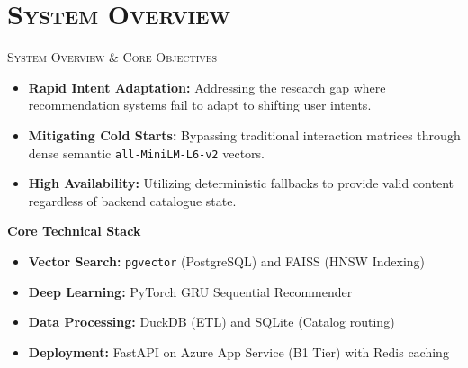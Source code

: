 \documentclass[xcolor=dvipsnames, aspectratio=1610]{beamer}
\begin{document}
\section{\textsc{System Overview}}
\begin{frame}{\textsc{System Overview \& Core Objectives}}

  \begin{itemize}
    \item \textbf{Rapid Intent Adaptation:} Addressing the research gap where recommendation systems fail to adapt to shifting user intents.
    \item \textbf{Mitigating Cold Starts:} Bypassing traditional interaction matrices through dense semantic \texttt{all-MiniLM-L6-v2} vectors.
    \item \textbf{High Availability:} Utilizing deterministic fallbacks to provide valid content regardless of backend catalogue state.
  \end{itemize}

  \vspace{2.5mm}
  \begin{ExampleBox}
    \textbf{Core Technical Stack}
    \begin{itemize}
      \item \textbf{Vector Search:} \texttt{pgvector} (PostgreSQL) and FAISS (HNSW Indexing)
      \item \textbf{Deep Learning:} PyTorch GRU Sequential Recommender
      \item \textbf{Data Processing:} DuckDB (ETL) and SQLite (Catalog routing)
      \item \textbf{Deployment:} FastAPI on Azure App Service (B1 Tier) with Redis caching
    \end{itemize}
  \end{ExampleBox}

\end{frame}

\end{document}
